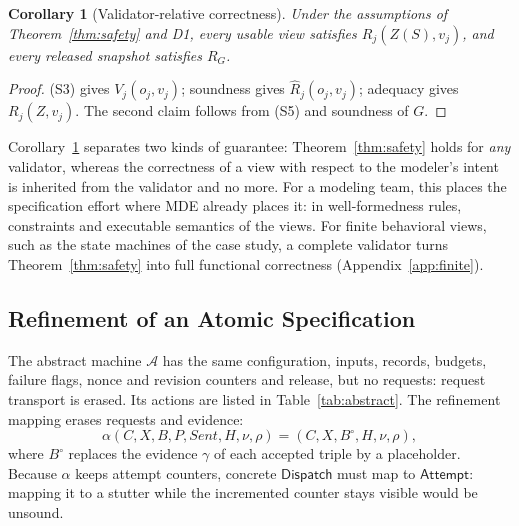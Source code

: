 \documentclass[pdflatex,sn-mathphys-num]{sn-jnl}
\theoremstyle{thmstyleone}%
\newtheorem{corollary}[theorem]{Corollary}%
\theoremstyle{thmstyletwo}%
\theoremstyle{thmstylethree}%
\newcommand{\Sent}{\mathit{Sent}}
\newcommand{\Disp}{\mathsf{Dispatch}}
\begin{document}
\begin{corollary}[Validator-relative correctness]\label{cor:domain}
Under the assumptions of Theorem~\ref{thm:safety} and D1, every usable view satisfies $R_j(Z(S),v_j)$, and every released snapshot satisfies $R_G$.
\end{corollary}
\begin{proof}
(S3) gives $V_j(o_j,v_j)$; soundness gives $\widehat R_j(o_j,v_j)$; adequacy gives $R_j(Z,v_j)$. The second claim follows from (S5) and soundness of $G$.
\end{proof}
Corollary~\ref{cor:domain} separates two kinds of guarantee: Theorem~\ref{thm:safety} holds for \emph{any} validator, whereas the correctness of a view with respect to the modeler's intent is inherited from the validator and no more. For a modeling team, this places the specification effort where MDE already places it: in well-formedness rules, constraints and executable semantics of the views. For finite behavioral views, such as the state machines of the case study, a complete validator turns Theorem~\ref{thm:safety} into full functional correctness (Appendix~\ref{app:finite}).

\subsection{Refinement of an Atomic Specification}\label{sec:refine}
The abstract machine $\mathcal A$ has the same configuration, inputs, records, budgets, failure flags, nonce and revision counters and release, but no requests: request transport is erased. Its actions are listed in Table~\ref{tab:abstract}. The refinement mapping erases requests and evidence:
\begin{equation}\label{eq:alpha}
\alpha(C,X,B,P,\Sent,H,\nu,\rho)=(C,X,B^{\circ},H,\nu,\rho),
\end{equation}
where $B^{\circ}$ replaces the evidence $\gamma$ of each accepted triple by a placeholder. Because $\alpha$ keeps attempt counters, concrete $\Disp$ must map to $\mathsf{Attempt}$: mapping it to a stutter while the incremented counter stays visible would be unsound.
\end{document}
